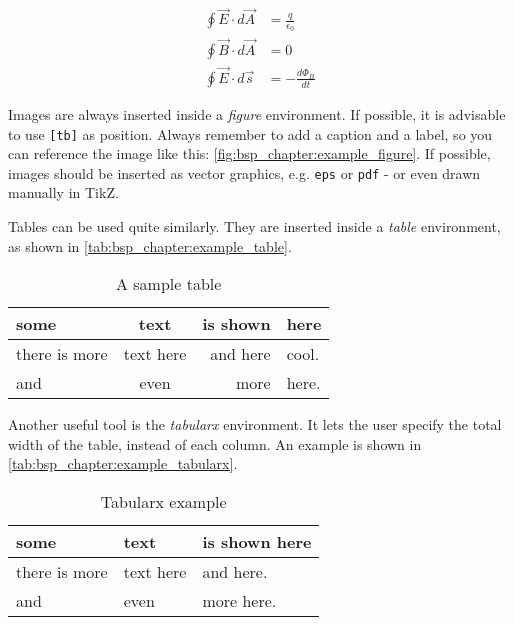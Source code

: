 \documentclass[
a4paper, %
10pt, %
unnumberedsections, %
twoside, %
]{LTJournalArticle}
\begin{document}
	\begin{align}
		\oint \vec{E} \cdot d \vec{A} &= \frac{q}{\epsilon_0} \\
		\oint \vec{B} \cdot d \vec{A} &= 0 \\
		\oint \vec{E} \cdot d \vec{s} &= - \frac{d \Phi_B}{dt}
		\label{equ:bsp_chapter:example_align}
	\end{align}
	
	Images are always inserted inside a \emph{figure}
	environment. If possible, it is advisable to use \texttt{[tb]} as position.
	Always remember to add a caption and a label, so you can reference the image
	like this: \autoref{fig:bsp_chapter:example_figure}. If possible, images should be
	inserted as vector graphics, e.g. \texttt{eps} or \texttt{pdf} - or even drawn
	manually in TikZ.
	
	Tables can be used quite similarly. They are inserted inside a \emph{table}
	environment, as shown in \autoref{tab:bsp_chapter:example_table}.
	
	\begin{table}[t]
		\centering
		\begin{tabular}{lcrl} \toprule
			some & text & is shown & here \\ \midrule
			there is more & text here & and here & cool. \\
			and & even & more & here. \\ \bottomrule
		\end{tabular}
		\caption{A sample table}
		\label{tab:bsp_chapter:example_table}
	\end{table}
	
	Another useful tool is the \emph{tabularx} environment. It lets the user specify the total width of the table, instead of each column. 
	An example is shown in \autoref{tab:bsp_chapter:example_tabularx}.
	
	\begin{table}[t]
		\centering
		\begin{tabularx}{0.9\linewidth}{lXX} \toprule
			some & text & is shown here \\ \midrule
			there is more & text here & and here. \\
			and & even & more here. \\ \bottomrule
		\end{tabularx}
		\caption{Tabularx example}
		\label{tab:bsp_chapter:example_tabularx}
	\end{table}
	
\end{document}
